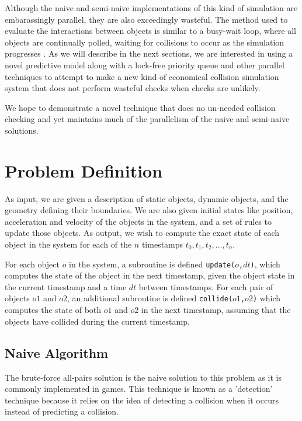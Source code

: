 \documentclass[conference]{IEEEtran}
\begin{document}
Although the naive and semi-naive implementations of this kind of simulation are embarassingly parallel, they are also exceedingly wasteful.  The method used to evaluate the interactions between objects is similar to a busy-wait loop, where all objects are continually polled, waiting for collisions to occur as the simulation progresses \cite{nbodycollisions,Moore88collisiondetection}.   As we will describe in the next sections, we are interested in using a novel predictive model along with a lock-free priority queue and other parallel techniques to attempt to make a new kind of economical collision simulation system that does not perform wasteful checks when checks are unlikely.

We hope to demonstrate a novel technique that does no un-needed collision checking and yet maintains much of the parallelism of the naive and semi-naive solutions.

\section{Problem Definition}

As input, we are given a description of static objects, dynamic objects, and the geometry defining their boundaries.  We are also given initial states like position, acceleration and velocity of the objects in the system, and a set of rules to update those objects.  As output, we wish to compute the exact state of each object in the system for each of the $n$ timestamps $t_0, t_1, t_2, \ldots, t_n$.

For each object $o$ in the system, a subroutine is defined \texttt{update($o$,$dt$)}, which computes the state of the object in the next timestamp, given the object state in the current timestamp and a time $dt$ between timestamps.  For each pair of objects $o1$ and $o2$, an additional subroutine is defined \texttt{collide($o1$,$o2$)} which computes the state of both $o1$ and $o2$ in the next timestamp, assuming that the objects have collided during the current timestamp.

\subsection{Naive Algorithm}

The brute-force all-pairs solution is the naive solution to this problem as it is commonly implemented in games.   This technique is known as a 'detection' technique because it relies on the idea of detecting a collision when it occurs instead of predicting a collision.  
\end{document}
